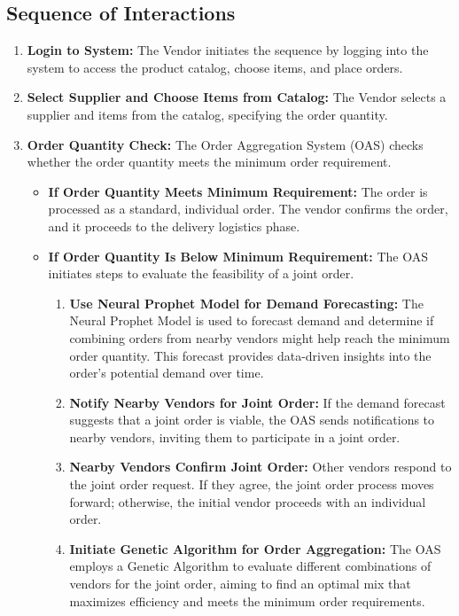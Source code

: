 \subsection{Sequence of Interactions}

\begin{enumerate}
    \item \textbf{Login to System:} The Vendor initiates the sequence by logging into the system to access the product catalog, choose items, and place orders.
    \item \textbf{Select Supplier and Choose Items from Catalog:} The Vendor selects a supplier and items from the catalog, specifying the order quantity.
    \item \textbf{Order Quantity Check:} The Order Aggregation System (OAS) checks whether the order quantity meets the minimum order requirement.
          \begin{itemize}
              \item \textbf{If Order Quantity Meets Minimum Requirement:} The order is processed as a standard, individual order. The vendor confirms the order, and it proceeds to the delivery logistics phase.
              \item \textbf{If Order Quantity Is Below Minimum Requirement:} The OAS initiates steps to evaluate the feasibility of a joint order.
                    \begin{enumerate}
                        \item \textbf{Use Neural Prophet Model for Demand Forecasting:} The Neural Prophet Model is used to forecast demand and determine if combining orders from nearby vendors might help reach the minimum order quantity. This forecast provides data-driven insights into the order’s potential demand over time.
                        \item \textbf{Notify Nearby Vendors for Joint Order:} If the demand forecast suggests that a joint order is viable, the OAS sends notifications to nearby vendors, inviting them to participate in a joint order.
                        \item \textbf{Nearby Vendors Confirm Joint Order:} Other vendors respond to the joint order request. If they agree, the joint order process moves forward; otherwise, the initial vendor proceeds with an individual order.
                        \item \textbf{Initiate Genetic Algorithm for Order Aggregation:} The OAS employs a Genetic Algorithm to evaluate different combinations of vendors for the joint order, aiming to find an optimal mix that maximizes efficiency and meets the minimum order requirements.

\end{enumerate}
\end{itemize}
\end{enumerate}
